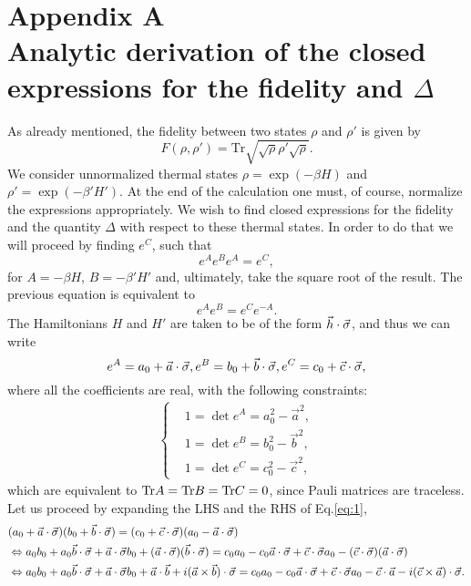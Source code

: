 \chapter*{Appendix A\\Analytic derivation of the closed expressions for the fidelity and $\Delta$}
As already mentioned, the fidelity between two states $\rho$ and $\rho'$ is given by
\begin{equation}
F(\rho,\rho')=\text{Tr}\sqrt{\sqrt{\rho}\rho'\sqrt{\rho}}.
\end{equation}
We consider unnormalized thermal states $\rho=\exp(-\beta H)$ and $\rho'=\exp(-\beta' H')$. At the end of the calculation one must, of course, normalize the expressions appropriately. We wish to find closed expressions for the fidelity and the quantity $\Delta$ with respect to these thermal states. In order to do that we will proceed by finding $e^C$, such that
\begin{equation}
e^{A}e^{B}e^{A}=e^{C},
\end{equation}
for $A=-\beta H$, $B=-\beta'H'$ and, ultimately, take the square root of the result. The previous equation is equivalent to
\begin{equation}
e^{A}e^{B}=e^{C}e^{-A}.
\label{eq:1}
\end{equation}
The Hamiltonians $H$ and $H'$ are taken to be of the form $\vec{h}\cdot\vec{\sigma}$, and thus we can write
\begin{equation}
e^{A}=a_0+\vec{a}\cdot\vec{\sigma}, \nonumber \\
e^{B}=b_0+\vec{b}\cdot\vec{\sigma}, \nonumber \\
e^{C}=c_0+\vec{c}\cdot\vec{\sigma},
\end{equation}
where all the coefficients are real, with the following constraints:
\begin{eqnarray}
\label{eq:c1}
\begin{cases}
& 1=\det e^{A}=a_{0}^2-\vec{a}^2,\\
\label{eq:c2}
& 1=\det e^{B}=b_{0}^2-\vec{b}^2,\\
\label{eq:c3}
& 1=\det e^{C}=c_{0}^2-\vec{c}^2,
\end{cases}
\end{eqnarray}
which are equivalent to $\text{Tr} A = \text{Tr} B = \text{Tr} C = 0$, since Pauli matrices are traceless. Let us proceed by expanding the LHS and the RHS of Eq.\eqref{eq:1},
\begin{eqnarray}
& (a_0+\vec{a}\cdot\vec{\sigma})(b_0+\vec{b}\cdot\vec{\sigma})=(c_0+\vec{c}\cdot\vec{\sigma})(a_0-\vec{a}\cdot\vec{\sigma}) \nonumber \\
& \Leftrightarrow a_0 b_0+ a_0\vec{b}\cdot\vec{\sigma}+\vec{a}\cdot\vec{\sigma}b_0+ (\vec{a}\cdot\vec{\sigma})(\vec{b}\cdot\vec{\sigma}) = c_0 a_0-c_0\vec{a}\cdot\vec{\sigma}+\vec{c}\cdot\vec{\sigma}a_0 -(\vec{c}\cdot\vec{\sigma})(\vec{a}\cdot\vec{\sigma})  \nonumber \\
& \Leftrightarrow a_0 b_0 +a_0 \vec{b}\cdot\vec{\sigma}+\vec{a}\cdot\vec{\sigma}b_0+ \vec{a}\cdot\vec{b}+i(\vec{a}\times \vec{b})\cdot \vec{\sigma}=c_0 a_0-c_0\vec{a}\cdot\vec{\sigma}+\vec{c}\cdot\vec{\sigma}a_0 -\vec{c}\cdot\vec{a}-i(\vec{c}\times \vec{a})\cdot\vec{\sigma}.
\end{eqnarray}
